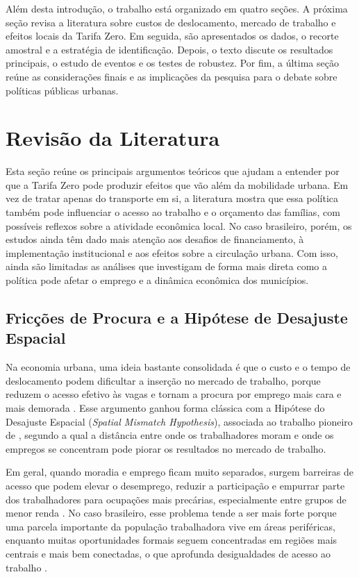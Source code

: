 \documentclass[12pt, a4paper]{article}
\begin{document}
Além desta introdução, o trabalho está organizado em quatro seções.
A próxima seção revisa a literatura sobre custos de deslocamento, mercado de trabalho e efeitos locais da Tarifa Zero.
Em seguida, são apresentados os dados, o recorte amostral e a estratégia de identificação.
Depois, o texto discute os resultados principais, o estudo de eventos e os testes de robustez.
Por fim, a última seção reúne as considerações finais e as implicações da pesquisa para o debate sobre políticas públicas urbanas.

\section{Revisão da Literatura}
Esta seção reúne os principais argumentos teóricos que ajudam a entender por que a Tarifa Zero pode produzir efeitos que vão além da mobilidade urbana.
Em vez de tratar apenas do transporte em si, a literatura mostra que essa política também pode influenciar o acesso ao trabalho e o orçamento das famílias, com possíveis reflexos sobre a atividade econômica local.
No caso brasileiro, porém, os estudos ainda têm dado mais atenção aos desafios de financiamento, à implementação institucional e aos efeitos sobre a circulação urbana.
Com isso, ainda são limitadas as análises que investigam de forma mais direta como a política pode afetar o emprego e a dinâmica econômica dos municípios.

\subsection{Fricções de Procura e a Hipótese de Desajuste Espacial}
Na economia urbana, uma ideia bastante consolidada é que o custo e o tempo de deslocamento podem dificultar a inserção no mercado de trabalho, porque reduzem o acesso efetivo às vagas e tornam a procura por emprego mais cara e mais demorada \citep{gobilonselodzenou2007, BastiaassemJohnsonLucas2020}.
Esse argumento ganhou forma clássica com a Hipótese do Desajuste Espacial (\textit{Spatial Mismatch Hypothesis}), associada ao trabalho pioneiro de \citet{kain1968}, segundo a qual a distância entre onde os trabalhadores moram e onde os empregos se concentram pode piorar os resultados no mercado de trabalho.

Em geral, quando moradia e emprego ficam muito separados, surgem barreiras de acesso que podem elevar o desemprego, reduzir a participação e empurrar parte dos trabalhadores para ocupações mais precárias, especialmente entre grupos de menor renda \citep{BruecknerZenou2003, wangwuchao2022}.
No caso brasileiro, esse problema tende a ser mais forte porque uma parcela importante da população trabalhadora vive em áreas periféricas, enquanto muitas oportunidades formais seguem concentradas em regiões mais centrais e mais bem conectadas, o que aprofunda desigualdades de acesso ao trabalho \citep{silvaporsse2024, reisveras2024}.
\end{document}
